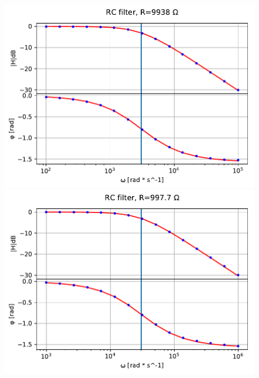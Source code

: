 \documentclass{article}
\begin{document}
\begin{figure}[h]
    \centering
    \begin{minipage}{0.5\textwidth}
        \centering
        \includegraphics[width=\textwidth]{bodeplot1.pdf} 
    \end{minipage}\hfill
    \begin{minipage}{0.5\textwidth}
        \centering
        \includegraphics[width=\textwidth]{bodeplot2.pdf} 
    \end{minipage}
    \\
    \centering
    \begin{minipage}{0.5\textwidth}
        \centering

\end{minipage}
\end{figure}
\end{document}
